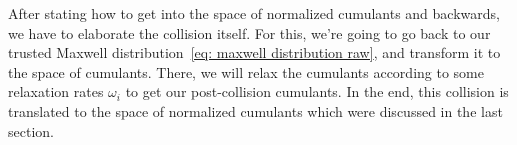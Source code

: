 
After stating how to get into the space of normalized cumulants and backwards, we have to elaborate the collision itself.
For this, we're going to go back to our trusted Maxwell distribution~\eqref{eq: maxwell distribution raw}, and transform it to the space of cumulants.
There, we will relax the cumulants according to some relaxation rates $\omega_i$ to get our post-collision cumulants.
In the end, this collision is translated to the space of normalized cumulants which were discussed in the last section.
